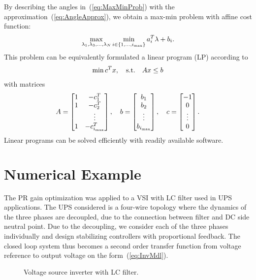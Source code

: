 \documentclass[conference,10pt]{IEEEtran}
\begin{document}
By describing the angles in~(\ref{eq:MaxMinProb})
with the approximation~(\ref{eq:AngleApprox}), we obtain a max-min problem with affine cost function:
\begin{align}
\label{eq:MaxMinProbApprox}
\max_{\lambda_1,\lambda_3,\dots, \lambda_N}\min_{i\in \{1, \dots, i_{\rm max}\}} a_i^T\lambda + b_i.
\end{align}
 This problem can be equivalently formulated a linear program (LP) according to
\begin{align}
\label{eq:MaxMinProbLP}
\min c^Tx,\quad {\rm s.t.} \quad Ax\le b
\end{align}
with matrices
\begin{align*}
A =
\begin{bmatrix}
1 & -c^T_1\\
1 & -c^T_2\\
 & \vdots \\
1 & -c^T_{i_{\rm max}}
\end{bmatrix},\quad
b =
\begin{bmatrix}
b_1\\
b_2\\
\vdots \\
b_{i_{\rm max}}
\end{bmatrix},\quad
c =
\begin{bmatrix}
-1\\
0\\
\vdots \\
0
\end{bmatrix}.
\end{align*}
Linear programs can be solved efficiently with readily available software.



\section{Numerical Example}

The PR gain optimization was applied to a VSI with LC filter used in UPS applications.
The UPS considered is a four-wire topology where the dynamics of the three phases are decoupled, due to the connection between filter and DC side neutral point. Due to the decoupling, we consider each of the three phases individually and design stabilizing controllers with proportional feedback. The closed loop system thus becomes a second order transfer function from voltage reference to output voltage on the form~(\ref{eq:InvMdl}).
\begin{figure}[!h]
\centering
{}
\psfrag{+}{\tiny{$+$}}
\scalebox{0.9}{

}
\caption{Voltage source inverter with LC filter.}
\label{fig:UPS_LC}
\end{figure}
\end{document}
